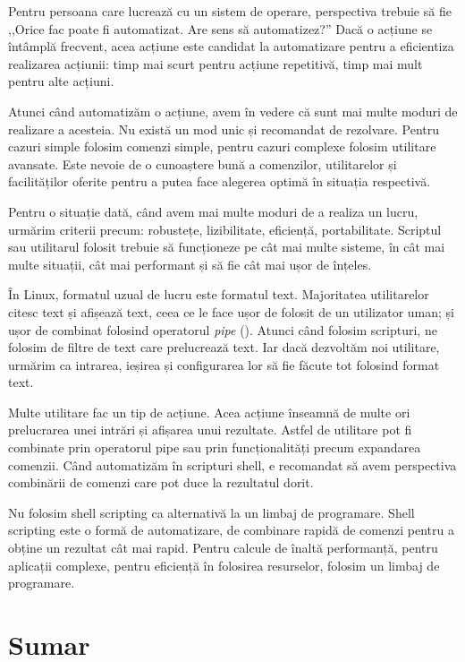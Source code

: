 Pentru persoana care lucrează cu un sistem de operare, perspectiva trebuie să fie ,,Orice fac poate fi automatizat. Are sens să automatizez?''
Dacă o acțiune se întâmplă frecvent, acea acțiune este candidat la automatizare pentru a eficientiza realizarea acțiunii: timp mai scurt pentru acțiune repetitivă, timp mai mult pentru alte acțiuni.

Atunci când automatizăm o acțiune, avem în vedere că sunt mai multe moduri de realizare a acesteia.
Nu există un mod unic și recomandat de rezolvare.
Pentru cazuri simple folosim comenzi simple, pentru cazuri complexe folosim utilitare avansate.
Este nevoie de o cunoaștere bună a comenzilor, utilitarelor și facilităților oferite pentru a putea face alegerea optimă în situația respectivă.

Pentru o situație dată, când avem mai multe moduri de a realiza un lucru, urmărim criterii precum: robustețe, lizibilitate, eficiență, portabilitate.
Scriptul sau utilitarul folosit trebuie să funcționeze pe cât mai multe sisteme, în cât mai multe situații, cât mai performant și să fie cât mai ușor de înțeles.

În Linux, formatul uzual de lucru este formatul text.
Majoritatea utilitarelor citesc text și afișează text, ceea ce le face ușor de folosit de un utilizator uman; și ușor de combinat folosind operatorul \textit{pipe} (\texttt{\textbar}).
Atunci când folosim scripturi, ne folosim de filtre de text care prelucrează text.
Iar dacă dezvoltăm noi utilitare, urmărim ca intrarea, ieșirea și configurarea lor să fie făcute tot folosind format text.

Multe utilitare fac un tip de acțiune.
Acea acțiune înseamnă de multe ori prelucrarea unei intrări și afișarea unui rezultate.
Astfel de utilitare pot fi combinate prin operatorul pipe sau prin funcționalități precum expandarea comenzii.
Când automatizăm în scripturi shell, e recomandat să avem perspectiva combinării de comenzi care pot duce la rezultatul dorit.

Nu folosim shell scripting ca alternativă la un limbaj de programare.
Shell scripting este o formă de automatizare, de combinare rapidă de comenzi pentru a obține un rezultat cât mai rapid.
Pentru calcule de înaltă performanță, pentru aplicații complexe, pentru eficiență în folosirea resurselor, folosim un limbaj de programare.

\section{Sumar}
\label{sec:auto:summary}

